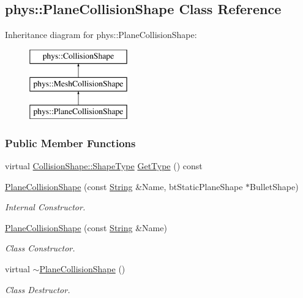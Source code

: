 \hypertarget{classphys_1_1PlaneCollisionShape}{
\subsection{phys::PlaneCollisionShape Class Reference}
\label{classphys_1_1PlaneCollisionShape}
}
Inheritance diagram for phys::PlaneCollisionShape:\begin{figure}[H]
\begin{center}
\leavevmode
\includegraphics[height=3.000000cm]{classphys_1_1PlaneCollisionShape}
\end{center}
\end{figure}
\subsubsection*{Public Member Functions}
\begin{DoxyCompactItemize}
\item 
virtual \hyperlink{classphys_1_1CollisionShape_af3ba4fd8af5b9557f912d2f5ff35a588}{CollisionShape::ShapeType} \hyperlink{classphys_1_1PlaneCollisionShape_ab166ba6b39e36986912f61cc7a89b666}{GetType} () const 
\item 
\hyperlink{classphys_1_1PlaneCollisionShape_a73517cc12d819dcdef87aaac9b01f5bc}{PlaneCollisionShape} (const \hyperlink{namespacephys_aa03900411993de7fbfec4789bc1d392e}{String} \&Name, btStaticPlaneShape $\ast$BulletShape)
\begin{DoxyCompactList}\small\item\em Internal Constructor. \item\end{DoxyCompactList}\item 
\hyperlink{classphys_1_1PlaneCollisionShape_ae871bfea20b3013276f94a46282f8d28}{PlaneCollisionShape} (const \hyperlink{namespacephys_aa03900411993de7fbfec4789bc1d392e}{String} \&Name)
\begin{DoxyCompactList}\small\item\em Class Constructor. \item\end{DoxyCompactList}\item 
\hypertarget{classphys_1_1PlaneCollisionShape_ae58b835bc028573d2ca7dc6f1cf902d9}{
virtual \hyperlink{classphys_1_1PlaneCollisionShape_ae58b835bc028573d2ca7dc6f1cf902d9}{$\sim$PlaneCollisionShape} ()}
\label{classphys_1_1PlaneCollisionShape_ae58b835bc028573d2ca7dc6f1cf902d9}

\begin{DoxyCompactList}\small\item\em Class Destructor. \item\end{DoxyCompactList}\end{DoxyCompactItemize}
